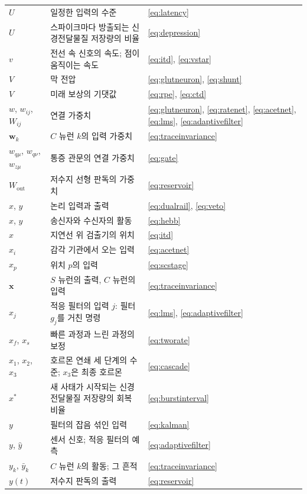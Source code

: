 \begin{center}
\begin{longtable}{>{\raggedright}p{2.0cm}>{\raggedright}p{9.6cm}>{\raggedright\arraybackslash}p{2.4cm}}
$U$ & 일정한 입력의 수준 & \eqref{eq:latency} \\
$U$ & 스파이크마다 방출되는 신경전달물질 저장량의 비율 & \eqref{eq:depression} \\
$v$ & 전선 속 신호의 속도; 점이 움직이는 속도 & \eqref{eq:itd}, \eqref{eq:vstar} \\
$V$ & 막 전압 & \eqref{eq:glutneuron}, \eqref{eq:shunt} \\
$V$ & 미래 보상의 기댓값 & \eqref{eq:rpe}, \eqref{eq:ctd} \\
$w$, $w_{ij}$, $W_{ij}$ & 연결 가중치 & \eqref{eq:glutneuron}, \eqref{eq:ratenet}, \eqref{eq:acetnet}, \eqref{eq:lms}, \eqref{eq:adaptivefilter} \\
$\mathbf w_k$ & $C$ 뉴런 $k$의 입력 가중치 & \eqref{eq:traceinvariance} \\
$w_{q\mu}$, $w_{q\nu}$, $w_{z\mu}$ & 통증 관문의 연결 가중치 & \eqref{eq:gate} \\
$W_{\text{out}}$ & 저수지 선형 판독의 가중치 & \eqref{eq:reservoir} \\
$x$, $y$ & 논리 입력과 출력 & \eqref{eq:dualrail}, \eqref{eq:veto} \\
$x$, $y$ & 송신자와 수신자의 활동 & \eqref{eq:hebb} \\
$x$ & 지연선 위 검출기의 위치 & \eqref{eq:itd} \\
$x_i$ & 감각 기관에서 오는 입력 & \eqref{eq:acetnet} \\
$x_p$ & 위치 $p$의 입력 & \eqref{eq:scstage} \\
$\mathbf x$ & $S$ 뉴런의 출력, $C$ 뉴런의 입력 & \eqref{eq:traceinvariance} \\
$x_j$ & 적응 필터의 입력 $j$: 필터 $g_j$를 거친 명령 & \eqref{eq:lms}, \eqref{eq:adaptivefilter} \\
$x_f$, $x_s$ & 빠른 과정과 느린 과정의 보정 & \eqref{eq:tworate} \\
$x_1$, $x_2$, $x_3$ & 호르몬 연쇄 세 단계의 수준; $x_3$은 최종 호르몬 & \eqref{eq:cascade} \\
$x^*$ & 새 사태가 시작되는 신경전달물질 저장량의 회복 비율 & \eqref{eq:burstinterval} \\
$y$ & 필터의 잡음 섞인 입력 & \eqref{eq:kalman} \\
$y$, $\hat y$ & 센서 신호; 적응 필터의 예측 & \eqref{eq:adaptivefilter} \\
$y_k$, $\bar y_k$ & $C$ 뉴런 $k$의 활동; 그 흔적 & \eqref{eq:traceinvariance} \\
$y(t)$ & 저수지 판독의 출력 & \eqref{eq:reservoir} \\

\end{longtable}
\end{center}

